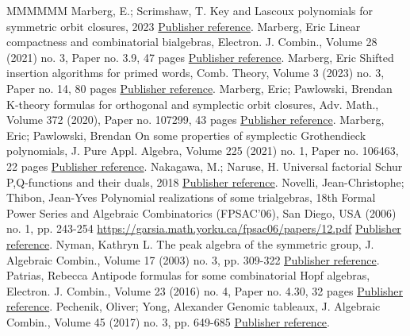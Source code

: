 \begin{thebibliography}{MMMMMM}
 Marberg, E.; Scrimshaw, T. Key and Lascoux polynomials for symmetric orbit closures, 2023 \href{https://alco.centre-mersenne.org/articles/10.5802/alco.362/#MarScr2023}{Publisher reference}.
 Marberg, Eric Linear compactness and combinatorial bialgebras, Electron. J. Combin., Volume 28 (2021) no. 3, Paper no. 3.9, 47 pages \href{https://alco.centre-mersenne.org/articles/10.5802/alco.362/#Marberg2018}{Publisher reference}.
 Marberg, Eric Shifted insertion algorithms for primed words, Comb. Theory, Volume 3 (2023) no. 3, Paper no. 14, 80 pages \href{https://alco.centre-mersenne.org/articles/10.5802/alco.362/#Marberg2021}{Publisher reference}.
 Marberg, Eric; Pawlowski, Brendan K-theory formulas for orthogonal and symplectic orbit closures, Adv. Math., Volume 372 (2020), Paper no. 107299, 43 pages \href{https://alco.centre-mersenne.org/articles/10.5802/alco.362/#MP2020}{Publisher reference}.
 Marberg, Eric; Pawlowski, Brendan On some properties of symplectic Grothendieck polynomials, J. Pure Appl. Algebra, Volume 225 (2021) no. 1, Paper no. 106463, 22 pages \href{https://alco.centre-mersenne.org/articles/10.5802/alco.362/#MP2021}{Publisher reference}.
 Nakagawa, M.; Naruse, H. Universal factorial Schur P,Q-functions and their duals, 2018 \href{https://alco.centre-mersenne.org/articles/10.5802/alco.362/#NN2018}{Publisher reference}.
 Novelli, Jean-Christophe; Thibon, Jean-Yves Polynomial realizations of some trialgebras, 18th Formal Power Series and Algebraic Combinatorics (FPSAC’06), San Diego, USA (2006) no. 1, pp. 243-254 \url{https://garsia.math.yorku.ca/fpsac06/papers/12.pdf} \href{https://alco.centre-mersenne.org/articles/10.5802/alco.362/#NovelliThibon}{Publisher reference}.
 Nyman, Kathryn L. The peak algebra of the symmetric group, J. Algebraic Combin., Volume 17 (2003) no. 3, pp. 309-322 \href{https://alco.centre-mersenne.org/articles/10.5802/alco.362/#Nyman}{Publisher reference}.
 Patrias, Rebecca Antipode formulas for some combinatorial Hopf algebras, Electron. J. Combin., Volume 23 (2016) no. 4, Paper no. 4.30, 32 pages \href{https://alco.centre-mersenne.org/articles/10.5802/alco.362/#Patrias}{Publisher reference}.
 Pechenik, Oliver; Yong, Alexander Genomic tableaux, J. Algebraic Combin., Volume 45 (2017) no. 3, pp. 649-685 \href{https://alco.centre-mersenne.org/articles/10.5802/alco.362/#PechenikYong}{Publisher reference}.

\end{thebibliography}
